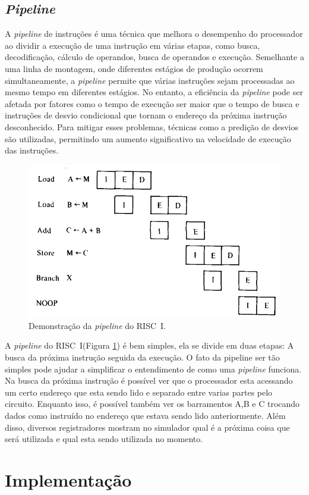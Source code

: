 \documentclass[
	article,			%
	11pt,				%
	oneside,			%
	a4paper,			%
	english,			%
	brazil,				%
	sumario=tradicional
	]{abntex2}
\begin{document}
\subsection{\textit{Pipeline}}
A \textit{pipeline} de instruções é uma técnica que melhora o desempenho do processador ao dividir a execução de uma instrução em várias etapas, como busca, decodificação, cálculo de operandos, busca de operandos e execução. Semelhante a uma linha de montagem, onde diferentes estágios de produção ocorrem simultaneamente, a \textit{pipeline} permite que várias instruções sejam processadas ao mesmo tempo em diferentes estágios. No entanto, a eficiência da \textit{pipeline} pode ser afetada por fatores como o tempo de execução ser maior que o tempo de busca e instruções de desvio condicional que tornam o endereço da próxima instrução desconhecido. Para mitigar esses problemas, técnicas como a predição de desvios são utilizadas, permitindo um aumento significativo na velocidade de execução das instruções. \cite[p.~47-51]{stallings_reduced_1988}

\begin{figure}
    \centering
    \includegraphics[width=0.5\linewidth]{pipelineRISCI.png}
    \caption{Demonstração da \textit{pipeline} do RISC~I.\cite{stallings_reduced_1988}}
    \label{fig:pipelineRISCI}
\end{figure}
A \textit{pipeline} do RISC~I(Figura \ref{fig:pipelineRISCI}) é bem simples, ela se divide em duas etapas: A busca da próxima instrução seguida da execução.  O fato da pipeline ser tão simples pode ajudar a simplificar o entendimento de como uma \textit{pipeline} funciona. Na busca da próxima instrução é possível ver que o processador esta acessando um certo endereço que esta sendo lido e separado entre varias partes pelo circuito. Enquanto isso, é possível também ver os barramentos A,B e C trocando dados como instruído no endereço que estava sendo lido anteriormente. Além disso, diversos registradores mostram no simulador qual é a próxima coisa que será utilizada e qual esta sendo utilizada no momento.

\section{Implementação}
\end{document}
